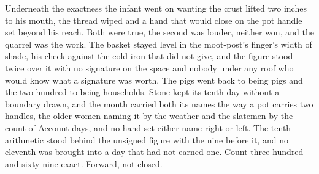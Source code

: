 Underneath the exactness the infant went on wanting the crust lifted two inches to his mouth, the thread wiped and a hand that would close on the pot handle set beyond his reach. Both were true, the second was louder, neither won, and the quarrel was the work. The basket stayed level in the moot-post's finger's width of shade, his cheek against the cold iron that did not give, and the figure stood twice over it with no signature on the space and nobody under any roof who would know what a signature was worth. The pigs went back to being pigs and the two hundred to being households. Stone kept its tenth day without a boundary drawn, and the month carried both its names the way a pot carries two handles, the older women naming it by the weather and the slatemen by the count of Account-days, and no hand set either name right or left. The tenth arithmetic stood behind the unsigned figure with the nine before it, and no eleventh was brought into a day that had not earned one. Count three hundred and sixty-nine exact. Forward, not closed.
